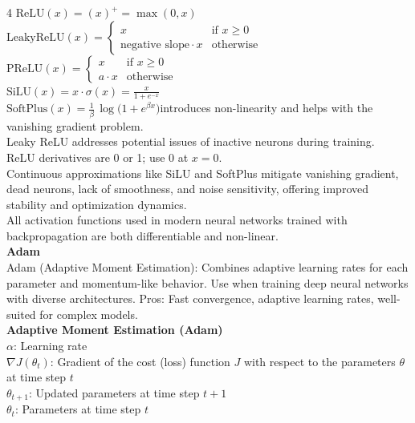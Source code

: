 \documentclass[8pt]{extarticle}
\begin{document}
\begin{multicols}{4}
$\text{ReLU}(x) = (x)^{+} = \max(0, x)$\\
$\text{LeakyReLU}(x) = \begin{cases} x & \text{if } x \ge 0 \\ \text{negative slope}\cdot x & \text{otherwise} \end{cases}$\\
$\text{PReLU}(x) = \begin{cases} x & \text{if } x \ge 0 \\ a\cdot x & \text{otherwise} \end{cases}$\\
$\text{SiLU}(x) = x \cdot \sigma(x) = \frac{x}{1 + e^{-x}}$\\
$\text{SoftPlus}(x) = \frac{1}{\beta}\,\log\!\bigl(1 + e^{\beta x}\bigr)$\ReLU introduces non-linearity and helps with the vanishing gradient problem.\\
Leaky ReLU addresses potential issues of inactive neurons during training.\\
ReLU derivatives are 0 or 1; use 0 at $x = 0$.\\
Continuous approximations like SiLU and SoftPlus mitigate vanishing gradient, dead neurons, lack of smoothness, and noise sensitivity, offering improved stability and optimization dynamics.\\
All activation functions used in modern neural networks trained with backpropagation are both differentiable and non-linear.\\
\vspace{2pt}\textbf{Adam}\\
Adam (Adaptive Moment Estimation): Combines adaptive learning rates for each parameter and momentum-like behavior. Use when training deep neural networks with diverse architectures. Pros: Fast convergence, adaptive learning rates, well-suited for complex models.\\
\vspace{2pt}\textbf{Adaptive Moment Estimation (Adam)}\\
$\alpha$: Learning rate\\
$\nabla J(\theta_t)$: Gradient of the cost (loss) function $J$ with respect to the parameters $\theta$ at time step $t$\\
$\theta_{t+1}$: Updated parameters at time step $t+1$\\
$\theta_t$: Parameters at time step $t$\\


\end{multicols}
\end{document}
